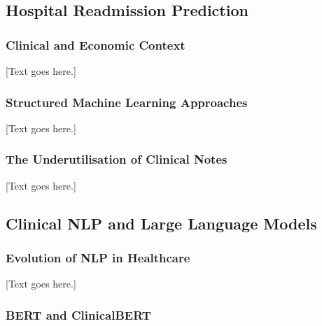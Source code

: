\documentclass[12pt, a4paper]{article}
\begin{document}
\subsection{Hospital Readmission Prediction}

\subsubsection{Clinical and Economic Context}

[Text goes here.]

\subsubsection{Structured Machine Learning Approaches}

[Text goes here.]

\subsubsection{The Underutilisation of Clinical Notes}

[Text goes here.]

\subsection{Clinical NLP and Large Language Models}

\subsubsection{Evolution of NLP in Healthcare}

[Text goes here.]

\subsubsection{BERT and ClinicalBERT}
\end{document}
